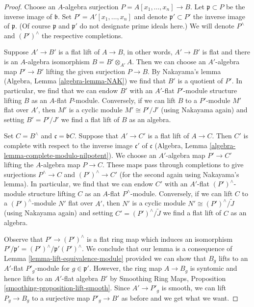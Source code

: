 \documentclass[10pt,a4paper]{amsart}
\theoremstyle{plain}
\theoremstyle{definition}
\theoremstyle{remark}
\numberwithin{equation}{subsection}
\begin{document}
\begin{proof}
Choose an $A$-algebra surjection $P = A[x_1, \ldots, x_n] \to B$.
Let $\mathfrak p \subset P$ be the inverse image of $\mathfrak b$.
Set $P' = A'[x_1, \ldots, x_n]$ and denote $\mathfrak p' \subset P'$
the inverse image of $\mathfrak p$. (Of course $\mathfrak p$
and $\mathfrak p'$ do not designate prime ideals here.)
We will denote $P^\wedge$ and $(P')^\wedge$ the respective completions.

\medskip\noindent
Suppose $A' \to B'$ is a flat lift of $A \to B$, in other words,
$A' \to B'$ is flat and there is an $A$-algebra isomorphism
$B = B' \otimes_{A'} A$. Then we can choose an $A'$-algebra map
$P' \to B'$ lifting the given surjection $P \to B$.
By Nakayama's lemma (Algebra, Lemma \ref{algebra-lemma-NAK})
we find that $B'$ is a quotient of $P'$. In particular, we find
that we can endow $B'$ with an $A'$-flat $P'$-module structure
lifting $B$ as an $A$-flat $P$-module.
Conversely, if we can lift $B$ to a $P'$-module $M'$ flat over $A'$,
then $M'$ is a cyclic module $M' \cong P'/J'$ (using Nakayama again)
and setting $B' = P'/J'$ we find a flat lift of $B$ as an algebra.

\medskip\noindent
Set $C = B^\wedge$ and $\mathfrak c = \mathfrak bC$.
Suppose that $A' \to C'$ is a flat lift of $A \to C$.
Then $C'$ is complete with respect to the inverse image $\mathfrak c'$
of $\mathfrak c$
(Algebra, Lemma \ref{algebra-lemma-complete-modulo-nilpotent}).
We choose an $A'$-algebra map $P' \to C'$ lifting
the $A$-algebra map $P \to C$. These maps pass through
completions to give surjections $P^\wedge \to C$ and $(P')^\wedge \to C'$
(for the second again using Nakayama's lemma).
In particular, we find that we can endow $C'$ with an $A'$-flat
$(P')^\wedge$-module structure lifting $C$ as an $A$-flat $P^\wedge$-module.
Conversely, if we can lift $C$ to a $(P')^\wedge$-module $N'$ flat over $A'$,
then $N'$ is a cyclic module $N' \cong (P')^\wedge/\tilde J$
(using Nakayama again) and setting $C' = (P')^\wedge/\tilde J$
we find a flat lift of $C$ as an algebra.

\medskip\noindent
Observe that $P' \to (P')^\wedge$ is a flat ring map which
induces an isomorphism $P'/\mathfrak p' = (P')^\wedge/\mathfrak p'(P')^\wedge$.
We conclude that our lemma is a consequence of
Lemma \ref{lemma-lift-equivalence-module} provided we can
show that $B_g$ lifts to an $A'$-flat $P'_g$-module for
$g \in \mathfrak p'$. However, the ring map $A \to B_g$ is syntomic
and hence lifts to an $A'$-flat algebra $B'$ by
Smoothing Ring Maps, Proposition \ref{smoothing-proposition-lift-smooth}.
Since $A' \to P'_g$ is smooth, we can lift $P_g \to B_g$
to a surjective map $P'_g \to B'$ as before and we get what we want.
\end{proof}
\end{document}
